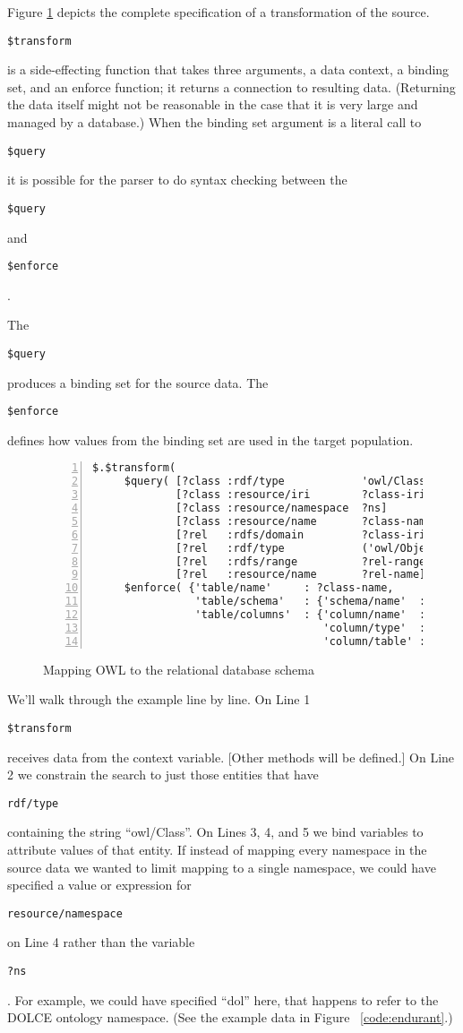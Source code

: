 \documentclass[9pt,letterpaper]{article}
\newcommand{\stt}[1]{\begin{footnotesize}\texttt{#1}\end{footnotesize}}
\begin{document}
Figure \ref{code:mapping-owl-to-rdbms} depicts the complete specification of a transformation of the source.
\stt{\$transform} is a side-effecting function that takes three arguments, a data context, a binding set, and an enforce function;
it returns a connection to resulting data.
(Returning the data itself might not be reasonable in the case that it is very large and managed by a database.)
When the binding set argument is a literal call to \stt{\$query} it is possible for the parser to do syntax checking between
the \stt{\$query} and \stt{\$enforce}.

The \stt{\$query} produces a binding set for the source data.
The \stt{\$enforce} defines how values from the binding set are used in the target population.

\begin{figure}[H]
  \caption{Mapping OWL to the relational database schema}
  \label{code:mapping-owl-to-rdbms}
\begin{lstlisting}[numberstyle=\scriptsize,basicstyle=\ttfamily\scriptsize,numbers=left,stepnumber=1,breaklines=true]
 $.$transform(
     $query( [?class :rdf/type            'owl/Class']
             [?class :resource/iri        ?class-iri]
             [?class :resource/namespace  ?ns]
             [?class :resource/name       ?class-name]
             [?rel   :rdfs/domain         ?class-iri]
             [?rel   :rdf/type            ('owl/ObjectProperty' or 'owl/DataProperty')]
             [?rel   :rdfs/range          ?rel-range]
             [?rel   :resource/name       ?rel-name])
     $enforce( {'table/name'     : ?class-name,
                'table/schema'   : {'schema/name'  : ?ns},
                'table/columns'  : {'column/name'  : ?rel-name,
                                    'column/type'  : ?rel-range,
                                    'column/table' : ?table-ent}} as ?table-ent))
\end{lstlisting}
\end{figure}

We'll walk through the example line by line.
On Line 1 \stt{\$transform} receives data from the context variable. [Other methods will be defined.] %
On Line 2 we constrain the search to just those entities that have \stt{rdf/type} containing the string ``owl/Class''.
On Lines 3, 4, and 5 we bind variables to attribute values of that entity.
If instead of mapping every namespace in the source data we wanted to limit mapping to a single namespace,
we could have specified a value or expression for \stt{resource/namespace} on Line 4 rather than the variable \stt{?ns}.
For example, we could have specified ``dol'' here, that happens to refer to the DOLCE ontology namespace.
(See the example data in Figure ~\ref{code:endurant}.)
\end{document}
